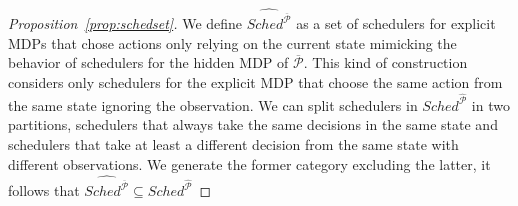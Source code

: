 \begin{proof}[Proposition~\ref{prop:schedset}]
	We define $\widehat{Sched^{\overline{\mathcal{P}}}}$ as a set of schedulers for explicit \acp{MDP} that chose actions only relying on the current state mimicking the behavior of schedulers for the hidden \ac{MDP} of $\overline{\mathcal{P}}$. This kind of construction considers only schedulers for the explicit \ac{MDP} that choose the same action from the same state ignoring the observation. 
	We can split schedulers in $Sched^{\mathcal{\widehat{P}}}$ in two partitions, schedulers that always take the same decisions in the same state and schedulers that take at least a different decision from the same state with different observations. We generate the former category excluding the latter, it follows that $\widehat{Sched^{\overline{\mathcal{P}}}} \subseteq Sched^{\widehat{\mathcal{P}}}$
\end{proof}

